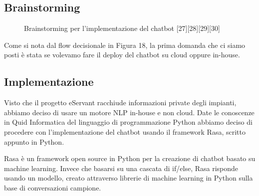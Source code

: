 \subsection{Brainstorming}
\begin{figure}[htp]
    \centering  
    \caption{Brainstorming per l'implementazione del chatbot [27][28][29][30]}
\end{figure}


Come si nota dal flow decisionale in Figura 18, la prima domanda che ci siamo posti è stata se volevamo fare il deploy del
chatbot su cloud oppure in-house.\\

\subsection{Implementazione}

\begin{figure}[htp]
    \centering  
\end{figure}

Visto che il progetto eServant racchiude informazioni private degli impianti, abbiamo deciso di usare un motore
NLP in-house e non cloud.
Date le conoscenze in Quid Informatica del linguaggio di programmazione Python abbiamo deciso di procedere
con l'implementazione del chatbot usando il framework Rasa, scritto appunto in Python.

Rasa è un framework open source in Python per la creazione di chatbot basato su machine learning.
Invece che basarsi su una cascata di if/else, Rasa risponde usando un modello, creato attraverso
librerie di machine learning in Python sulla base di conversazioni campione.
